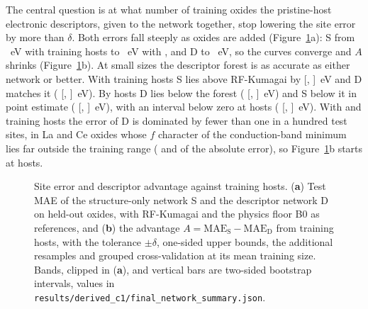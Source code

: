 The central question is at what number of training oxides the pristine-host electronic descriptors, given to the network together, stop lowering the site error by more than $\delta$. Both errors fall steeply as oxides are added (Figure~\ref{fig:learning_curves}a): S from \numNetTwentyFiveMaeS{}~eV with \numCfgBudgetsHostsItemOne{} training hosts to \numNetSixHundredFiftyFourMaeS{}~eV with \numCfgBudgetsMax{}, and D to \numNetSixHundredFiftyFourMaeD{}~eV, so the curves converge and $A$ shrinks (Figure~\ref{fig:learning_curves}b). At small sizes the descriptor forest is as accurate as either network or better. With \numCfgBudgetsHostsItemThree{} training hosts S lies above RF-Kumagai by \numNetCrossSMinusRfOneHundred{} [\numNetCrossSMinusRfOneHundredLo{}, \numNetCrossSMinusRfOneHundredHi{}]~eV and D matches it (\numNetCrossDMinusRfOneHundred{} [\numNetCrossDMinusRfOneHundredLo{}, \numNetCrossDMinusRfOneHundredHi{}]~eV). By \numCfgBudgetsHostsItemFour{} hosts D lies below the forest (\numNetCrossDMinusRfTwoHundred{} [\numNetCrossDMinusRfTwoHundredLo{}, \numNetCrossDMinusRfTwoHundredHi{}]~eV) and S below it in point estimate (\numNetCrossSMinusRfTwoHundred{} [\numNetCrossSMinusRfTwoHundredLo{}, \numNetCrossSMinusRfTwoHundredHi{}]~eV), with an interval below zero at \numNetCrossSBudget{} hosts (\numNetCrossSMinusRfSixHundredFiftyFour{} [\numNetCrossSMinusRfSixHundredFiftyFourLo{}, \numNetCrossSMinusRfSixHundredFiftyFourHi{}]~eV). With \numCfgBudgetsHostsItemOne{} and \numCfgBudgetsHostsItemTwo{} training hosts the error of D is dominated by fewer than one in a hundred test sites, in La and Ce oxides whose $f$ character of the conduction-band minimum lies far outside the training range (\numNetDsmallTwentyFiveExtremeShare{} and \numNetDsmallFiftyExtremeShare{} of the absolute error), so Figure~\ref{fig:learning_curves}b starts at \numCfgBudgetsHostsItemThree{} hosts.

\begin{figure}[H]
\centering
{}
\caption{Site error and descriptor advantage against training hosts. (\textbf{a}) Test MAE of the structure-only network S and the descriptor network D on held-out oxides, with RF-Kumagai and the physics floor B0 as references, and (\textbf{b}) the advantage $A = \mathrm{MAE}_\mathrm{S} - \mathrm{MAE}_\mathrm{D}$ from \numCfgBudgetsHostsItemThree{} training hosts, with the tolerance $\pm\delta$, one-sided upper bounds, the additional resamples and grouped cross-validation at its mean training size. Bands, clipped in (\textbf{a}), and vertical bars are two-sided bootstrap intervals, values in \texttt{results/derived\_c1/final\_network\_summary.json}.\label{fig:learning_curves}}
\end{figure}

